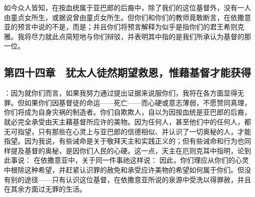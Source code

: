 \par

如今众人皆知，在按血统属于亚巴郎的后裔中，除了我们的这位基督外，没有一人由童贞女所生，或据说曾由童贞女所生。但你们和你们的教师竟敢断言，在依撒意亚的预言中说的不是，而是；并且你们将预言解释为似乎是指你们的君王希则克雅。我将尽力就此点简短地与你们辩驳，并表明其中指的是我们所承认为基督的那一位。\par


\subsection{第四十四章　犹太人徒然期望救恩，惟藉基督才能获得}

：因为就你们而言，如果我努力通过提出证据来说服你们，我将在各方面显得无罪。但如果你们因基督徒的命运——死亡——而心硬或意志薄弱，不愿赞同真理，你们将成为自身灾祸的制造者。你们自欺欺人，自以为因按血统是亚巴郎的后裔，就必完全承受由天主藉基督所应许的美物。因为任何人，甚至他们中的任何人，都无可指望，只有那些在心灵上与亚巴郎的信德相似、并认识了一切奥秘的人，才能指望。因为我说，有些诫命是关于敬拜天主和实践正义的；但有些诫命和行为也同样提及基督的奥秘，是因你们人民的心硬。这一点，天主在厄则克耳中指明，论到此事说：  在依撒意亚中，关于同一件事祂这样说：  因此，你们理应从你们的心灵中根除这种希望，并赶紧认识罪的赦免和承受应许美物的希望如何属于你们。但没有别的途径——只有认识这位基督，在依撒意亚所说的泉源中受洗以得罪赦，并且在其余方面过无罪的生活。\par

